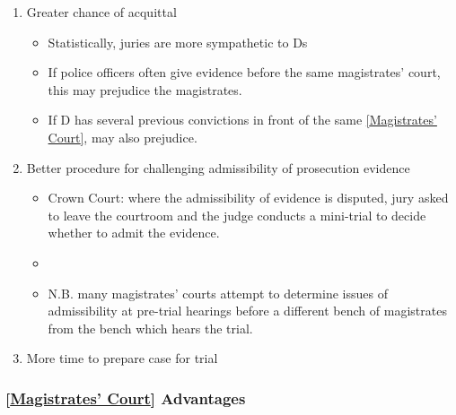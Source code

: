 \documentclass[
]{article}
\providecommand{\tightlist}{%
  \setlength{\itemsep}{0pt}\setlength{\parskip}{0pt}}
\begin{document}
\begin{enumerate}
\def\labelenumi{\arabic{enumi}.}
\tightlist
\item
  Greater chance of acquittal

  \begin{itemize}
  \tightlist
  \item
    Statistically, juries are more sympathetic to Ds
  \item
    If police officers often give evidence before the same magistrates'
    court, this may prejudice the magistrates.
  \item
    If D has several previous convictions in front of the same
    \href{maximum\%20compensation\%20of\%20£5,000\%20per\%20offence}{{[}Magistrates'
    Court{]}}, may also prejudice.
  \end{itemize}
\item
  Better procedure for challenging admissibility of prosecution evidence

  \begin{itemize}
  \tightlist
  \item
    Crown Court: where the admissibility of evidence is disputed, jury
    asked to leave the courtroom and the judge conducts a mini-trial to
    decide whether to admit the evidence.
  \item
  \item
    N.B. many magistrates' courts attempt to determine issues of
    admissibility at pre-trial hearings before a different bench of
    magistrates from the bench which hears the trial.
  \end{itemize}
\item
  More time to prepare case for trial
\end{enumerate}

\hypertarget{magistrates-court-advantages}{%
\subsubsection{\texorpdfstring{\href{maximum\%20compensation\%20of\%20£5,000\%20per\%20offence}{{[}Magistrates'
Court{]}}
Advantages}{{[}Magistrates' Court{]} Advantages}}\label{magistrates-court-advantages}}
\end{document}
